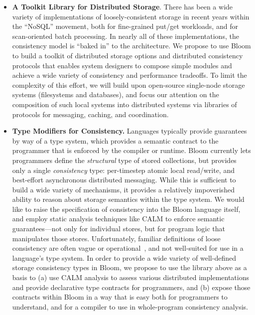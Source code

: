\begin{itemize}
\item \textbf{A Toolkit Library for Distributed Storage}.  There has been a wide variety of implementations of loosely-consistent storage in recent years within the ``NoSQL'' movement, both for fine-grained put/get workloads, and for scan-oriented batch processing.  In nearly all of these implementations, the consistency model is ``baked in'' to the architecture.  We propose to use Bloom to build a toolkit of distributed storage options and distributed consistency protocols that enables system designers to compose simple modules and achieve a wide variety of consistency and performance tradeoffs.  To limit the complexity of this effort, we will build upon open-source single-node storage systems (filesystems and databases), and focus our attention on the composition of such local systems into distributed systems via libraries of protocols for messaging, caching, and coordination.

\item \textbf{Type Modifiers for Consistency.}  Languages typically provide guarantees by way of a type system, which provides a semantic contract to the programmer that is enforced by the compiler or runtime. Bloom currently lets programmers define the \emph{structural} type of stored collections, but provides only a single \emph{consistency} type: per-timestep atomic local read/write, and best-effort asynchronous distributed messaging.  While this is sufficient to build a wide variety of mechanisms, it provides a relatively impoverished ability to reason about storage semantics within the type system.
We would like to raise the specification of consistency into the Bloom language itself, and employ static analysis techniques like CALM to enforce semantic guarantees---not only for individual stores, but for program logic that manipulates those stores.  Unfortunately, familiar definitions of loose consistency are often vague or operational~\cite{Vogels,bayou}, and not well-suited for use in a language's type system.  In order to provide a wide variety of well-defined storage consistency types in Bloom, we propose to use the library above as a basis to (a) use CALM analysis to assess various distributed implementations and provide declarative type contracts for programmers, and (b) expose those contracts within Bloom in a way that is easy both for programmers to understand, and for a compiler to use in whole-program consistency analysis.


\end{itemize}
